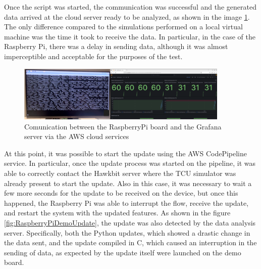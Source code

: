 Once the script was started, the communication was successful and the generated data arrived at the cloud server ready to be analyzed, as shown in the image \ref{fig:RaspberryPiDemo}. The only difference compared to the simulations performed on a local virtual machine was the time it took to receive the data. In particular, in the case of the Raspberry Pi, there was a delay in sending data, although it was almost imperceptible and acceptable for the purposes of the test.
\begin{figure}[h]  %
    \centering
    \includegraphics[width=0.9\textwidth]{images/RaspberryPiDemo.png}  %
    \caption{Comunication between the RaspberryPi board and the Grafana server via the AWS cloud services}
    \label{fig:RaspberryPiDemo}
\end{figure}

At this point, it was possible to start the update using the AWS CodePipeline service. In particular, once the update process was started on the pipeline, it was able to correctly contact the Hawkbit server where the TCU simulator was already present to start the update. 
Also in this case, it was necessary to wait a few more seconds for the update to be received on the device, but once this happened, the Raspberry Pi was able to interrupt the flow, receive the update, and restart the system with the updated features. 
As shown in the figure \ref{fig:RaspberryPiDemoUpdate}, the update was also detected by the data analysis server. Specifically, both the Python updates, which showed a drastic change in the data sent, and the update compiled in C, which caused an interruption in the sending of data, as expected by the update itself were launched on the demo board.

